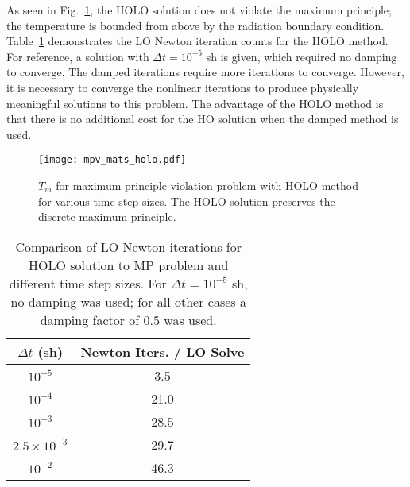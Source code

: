 As seen in
Fig.~\ref{fig:holo_mpv}, the HOLO solution does not violate the maximum principle; the
temperature is bounded from above by the radiation boundary condition.
Table~\ref{tab:mpv_iters} demonstrates the LO Newton iteration counts for the HOLO method.
For reference, a solution with $\Delta t = 10^{-5}$ sh is given, which required no damping
to converge.  The damped iterations require more iterations to converge.  However, it is necessary to converge the nonlinear iterations to produce
physically meaningful solutions to this problem.  The advantage of the HOLO method is that
there is no additional cost for the HO solution when the damped method is used.
\begin{figure}[htbp]
    \centering
    \texttt{[image: mpv\_mats\_holo.pdf]}
    \caption{\label{fig:holo_mpv}$T_m$ for maximum principle violation problem with HOLO method for various time step
    sizes. The HOLO solution preserves the discrete maximum principle.}
\end{figure}
\begin{table}[htbp]
    \caption{\label{tab:mpv_iters}Comparison of LO Newton iterations for HOLO solution to 
    MP problem and different time step sizes. For $\Delta t=10^{-5}$ sh, no damping was used; for
    all other cases a damping factor of $0.5$ was used.}  
    \centering
        \begin{tabular}{|cc|} \hline
            $\Delta t$ (sh) & Newton Iters. / LO Solve \\ \hline
            $10^{-5}$    & 3.5 \\
            $10^{-4}$    & 21.0 \\
            $10^{-3}$    & 28.5 \\
            $2.5\times10^{-3}$  & 29.7 \\
            $10^{-2}$    & 46.3 \\ \hline
        \end{tabular}
\end{table}




